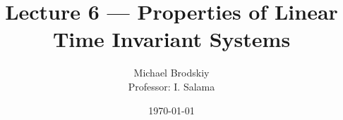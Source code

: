 


\title{Lecture 6 — Properties of Linear Time Invariant Systems}
\date{\today}
\author{Michael Brodskiy\\ \small Professor: I. Salama}



\maketitle

